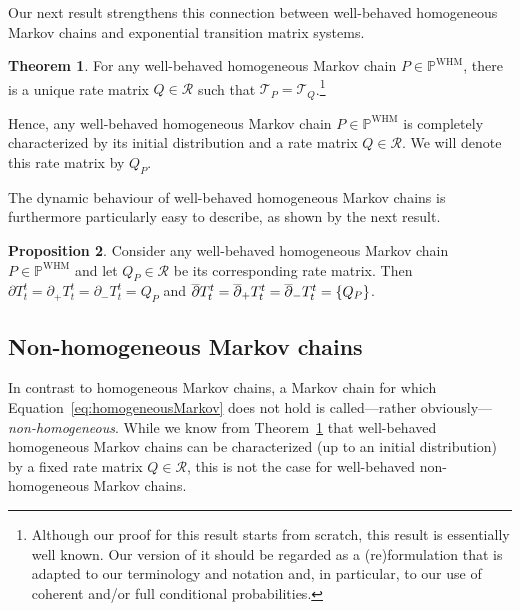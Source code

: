 \documentclass[10pt,a4paper]{paper}
\theoremstyle{definition}
\newtheorem{theorem}{Theorem}[section]
\newtheorem{proposition}[theorem]{Proposition}
\newcommand{\reals}{\mathbb{R}}
\newcommand{\realsnonneg}{\reals_{\geq 0}}
\newcommand{\processes}{\mathbb{P}}
\newcommand{\whmprocesses}{\processes^{\mathrm{WHM}}}
\begin{document}
Our next result strengthens this connection between well-behaved homogeneous Markov chains and exponential transition matrix systems.

\begin{theorem}\label{theo:homogeneoushasQ}
For any well-behaved homogeneous Markov chain $P\in\whmprocesses$, there is a unique rate matrix $Q\in\mathcal{R}$ such that $\mathcal{T}_P=\mathcal{T}_Q$.\footnote{Although our proof for this result starts from scratch, this result is essentially well known. Our version of it should be regarded as a (re)formulation that is adapted to our terminology and notation and, in particular, to our use of coherent and/or full conditional probabilities.}
\end{theorem}

Hence, any well-behaved homogeneous Markov chain $P\in\whmprocesses$ is completely characterized by its initial distribution and a rate matrix $Q\in\mathcal{R}$. We will denote this rate matrix by $Q_P$.


The dynamic behaviour of well-behaved homogeneous Markov chains is furthermore particularly easy to describe, as shown by the next result.
\begin{proposition}\label{prop:Q_is_singleton_deriv_for_homogen}
Consider any well-behaved homogeneous Markov chain $P\in\whmprocesses$ and let $Q_P\in\mathcal{R}$ be its corresponding rate matrix. Then $\partial T_t^t=\partial_+T_t^t=\partial_-T_t^t=Q_P$ and $\smash{\overline{\partial}}T_t^t=\smash{\overline{\partial}_+}T_t^t=\smash{\overline{\partial}_-}T_t^t=\{Q_P\}$.%
\end{proposition}

\subsection{Non-homogeneous Markov chains}\label{sec:nonhomogen_markov}

In contrast to homogeneous Markov chains, a Markov chain for which Equation~\eqref{eq:homogeneousMarkov} does not hold is called---rather obviously---\emph{non-homogeneous}. While we know from Theorem~\ref{theo:homogeneoushasQ} that well-behaved homogeneous Markov chains can be characterized (up to an initial distribution) by a fixed rate matrix $Q\in\mathcal{R}$, this is not the case for well-behaved non-homogeneous Markov chains. 
\end{document}
